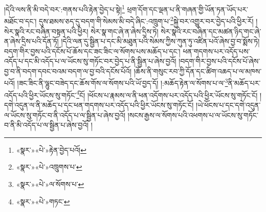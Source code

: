 །དེའི་ལས་ནི་མི་བདེ་བར་:གནས་པའི་རྟེན་བྱེད་པ་སྟེ།\footnote{«སྣར་»«པེ་»རྟེན་བྱེད་པའོ།} ཕྲག་དོག་དང་ལྡན་པ་ནི་གཞན་གྱི་ཡོན་ཏན་ཡོད་པར་མཐོང་བ་དང་། དུས་ཐམས་ཅད་དུ་བདག་གི་སེམས་མི་བདེ་ཞིང་:འཁྲུག་པ་\footnote{«སྣར་»«པེ་»འཁྲུགས་པ་}སྐྱེ་བར་འགྱུར་བར་བྱེད་པའི་ཕྱིར་རོ། །སེར་སྣའི་རང་བཞིན་བསྟན་པའི་ཕྱིར། སེར་སྣ་གང་ཞེ་ན་ཞེས་དྲིས་ཏེ། སེར་སྣའི་རང་བཞིན་དང་མཚན་ཉིད་གང་ཞེ་ན་ཞེས་དྲིས་པའི་དོན་ཏོ། །དེའི་ལན་དུ་སྦྱིན་པ་དང་མི་མཐུན་པའི་སེམས་ཀྱིས་ཀུན་ཏུ་འཛིན་པའོ་ཞེས་བྱ་བ་སྨོས་ཏེ། བདག་གིར་བྱས་པའི་དངོས་པོ་ཆོས་དང་ཟང་ཟིང་ལ་སོགས་པས་མཆོད་པ་དང་། ཕན་གདགས་པར་འདོད་པས་འདོད་པ་དང་མི་འདོད་པ་ལ་ཡོངས་སུ་གཏོང་བར་བྱེད་པ་ནི་སྦྱིན་པ་ཞེས་བྱའོ། །བདག་གིར་བྱས་པའི་དངོས་པོ་ཞེས་བྱ་བ་ནི་བདག་དབང་བའམ་བདག་ལ་བྱ་བའི་དངོས་པོའོ། །ཆོས་ནི་གསུང་རབ་ཀྱི་དོན་དང་ཚིག་འཆད་པ་ལ་མཁས་པའོ། །ཟང་ཟིང་ནི་ལྷུང་བཟེད་དང་ཆོས་གོས་ལ་སོགས་པའི་ཡོ་བྱད་དོ། །:མཆོད་རྟེན་ལ་སོགས་པ་ལ་\footnote{«སྣར་»«པེ་»ལ་སོགས་པ་}ནི་མཆོད་པར་འདོད་པའི་ཕྱིར་ཡོངས་སུ་གཏོང་\footnote{«སྣར་»«པེ་»གཏང་}ངོ། །ཕོངས་པ་རྣམས་ལ་ནི་ཕན་འདོགས་པར་འདོད་པའི་ཕྱིར་ཡོངས་སུ་གཏོང་ངོ། །དགེ་འདུན་ལ་ནི་མཆོད་པ་དང་ཕན་གདགས་པར་འདོད་པའི་ཕྱིར་ཡོངས་སུ་གཏོང་ངོ། །ཡེ་ཕོངས་པ་དང་དགེ་འདུན་ལ་ཡོངས་སུ་གཏོང་བ་ནི་འདོད་པ་ལ་སྦྱིན་པ་ཞེས་བྱའོ། །སངས་རྒྱས་ལ་སོགས་པའི་འཕགས་པ་ལ་ཡོངས་སུ་གཏོང་བ་ནི་མི་འདོད་པ་ལ་སྦྱིན་པ་ཞེས་བྱའོ། །
